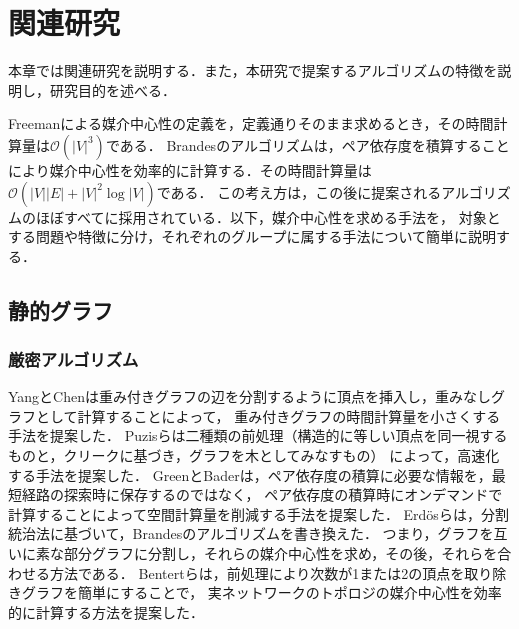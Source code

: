 
\chapter{関連研究}
\label{chap:related-work}

本章では関連研究を説明する．また，本研究で提案するアルゴリズムの特徴を説明し，研究目的を述べる．

Freemanによる媒介中心性の定義を，定義通りそのまま求めるとき，その時間計算量は$\mathcal{O}(|V|^3)$である．
Brandesのアルゴリズム\cite{Brandes2001}は，ペア依存度を積算することにより媒介中心性を効率的に計算する．その時間計算量は$\mathcal{O}(|V||E|+|V|^2\log|V|)$である．
この考え方は，この後に提案されるアルゴリズムのほぼすべてに採用されている．以下，媒介中心性を求める手法を，
対象とする問題や特徴に分け，それぞれのグループに属する手法について簡単に説明する．

\section{静的グラフ}

\subsection{厳密アルゴリズム}
YangとChen\cite{Yang2011}は重み付きグラフの辺を分割するように頂点を挿入し，重みなしグラフとして計算することによって，
重み付きグラフの時間計算量を小さくする手法を提案した．
Puzisら\cite{Puzis2012}は二種類の前処理（構造的に等しい頂点を同一視するものと，クリークに基づき，グラフを木としてみなすもの）
によって，高速化する手法を提案した．
GreenとBader\cite{Green2013}は，ペア依存度の積算に必要な情報を，最短経路の探索時に保存するのではなく，
ペア依存度の積算時にオンデマンドで計算することによって空間計算量を削減する手法を提案した．
Erd{\"{o}}sら\cite{Erdos2015}は，分割統治法に基づいて，Brandesのアルゴリズムを書き換えた．
つまり，グラフを互いに素な部分グラフに分割し，それらの媒介中心性を求め，その後，それらを合わせる方法である．
Bentertら\cite{Bentert2018}は，前処理により次数が1または2の頂点を取り除きグラフを簡単にすることで，
実ネットワークのトポロジの媒介中心性を効率的に計算する方法を提案した．

